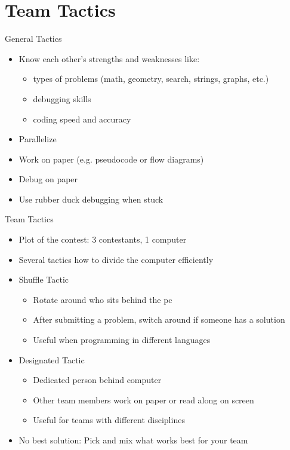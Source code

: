 \documentclass[11pt,pdf, aspectratio=169]{beamer}
\begin{document}
  \section{Team Tactics}
  \begin{frame}{General Tactics}
    \begin{itemize}
      \item Know each other's strengths and weaknesses like:
      \begin{itemize}
        \item types of problems (math, geometry, search, strings, graphs, etc.)
        \item debugging skills
        \item coding speed and accuracy
      \end{itemize}
      \item Parallelize
      \item Work on paper (e.g. pseudocode or flow diagrams)
      \item Debug on paper
      \item Use rubber duck debugging when stuck
    \end{itemize}
  \end{frame}
  \begin{frame}{Team Tactics}
    \begin{itemize}
      \item<1-> Plot of the contest: 3 contestants, 1 computer
      \item<2-> Several tactics how to divide the computer efficiently
      \item<3-> Shuffle Tactic\begin{itemize}
                                \item<4-> Rotate around who sits behind the pc
                                \item<4-> After submitting a problem, switch around if someone has a solution
                                \item<4-> Useful when programming in different languages
      \end{itemize}
      \item<3-> Designated Tactic\begin{itemize}
                                   \item<5->Dedicated person behind computer
                                   \item<5-> Other team members work on paper or read along on screen
                                   \item<5-> Useful for teams with different disciplines
      \end{itemize}
      \item<3-> No best solution: Pick and mix what works best for your team
    \end{itemize}
  \end{frame}
\end{document}
